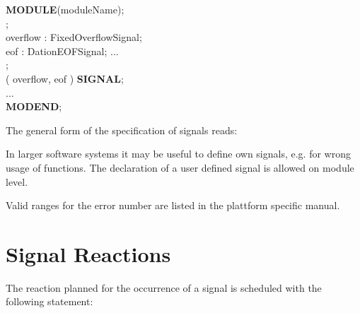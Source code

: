 {\bf MODULE}(moduleName);\\
;\\
\x \x overflow : FixedOverflowSignal;\\
\x \x eof : DationEOFSignal;
\x \x ...\\
;\\
\x {} ( overflow, eof ) {\bf SIGNAL};\\
\x \x ... \\
{\bf MODEND};

The general form of the specification of signals reads:




In larger software systems it may be useful to define own signals, e.g.
for wrong usage of functions. 
The declaration of a user defined signal is allowed on module level.



Valid ranges for the error number are listed in the plattform specific manual.


\section{Signal Reactions}
\label{sec_signal_reactions}
The reaction planned for the occurrence of a signal is scheduled with
the following statement:


